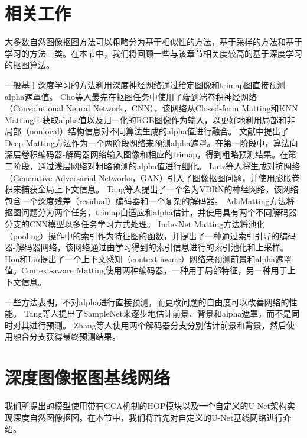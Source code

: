 \section{相关工作}
大多数自然图像抠图方法可以粗略分为基于相似性的方法\cite{levin2008closed,he2010fast,lee2011nonlocal,chen2013knn,aksoy2017designing}，基于采样的方法\cite{wang2007optimized,gastal2010shared,he2011global,feng2016cluster}和基于学习的方法\cite{xu2017deep,lutz2018alphagan,lu2019indices,samplenet,hou2019context,cai2019disentangled}三类。在本节中，我们将回顾一些与该章节相关度较高的基于深度学习的抠图算法。

一般基于深度学习的方法利用深度神经网络通过给定图像和trimap图直接预测alpha遮罩值。
Cho等人\cite{cho2019deep}最先在抠图任务中使用了端到端卷积神经网络（Convolutional Neural Network，CNN），该网络从Closed-form Matting\cite{levin2008closed}和KNN Matting\cite{chen2013knn}中获取alpha值以及归一化的RGB图像作为输入，以更好地利用局部和非局部（nonlocal）结构信息对不同算法生成的alpha值进行融合。
文献\parencite{xu2017deep}中提出了Deep Matting方法作为一个两阶段网络来预测alpha遮罩。在第一阶段中，算法向深层卷积编码器-解码器网络输入图像和相应的trimap，得到粗略预测结果。在第二阶段，通过浅层网络对粗略预测的alpha值进行细化。
Lutz等人\cite{lutz2018alphagan}将生成对抗网络（Generative Adversarial Networks，GAN）引入了图像抠图问题，并使用膨胀卷积来捕获全局上下文信息。
Tang等人\cite{tang2019very}提出了一个名为VDRN的神经网络，该网络包含一个深度残差（residual）编码器和一个复杂的解码器。
AdaMatting\cite{cai2019disentangled}方法将抠图问题分为两个任务，trimap自适应和alpha估计，并使用具有两个不同解码器分支的CNN模型以多任务学习方式处理。
IndexNet Matting\cite{lu2019indices}方法将池化（pooling）操作中的索引作为特征图的函数，并提出了一种通过索引引导的编码器-解码器网络，该网络通过由学习得到的索引信息进行的索引池化和上采样。
Hou和Liu\cite{hou2019context}提出了一个上下文感知（context-aware）网络来预测前景和alpha遮罩值。Context-aware Matting使用两种编码器，一种用于局部特征，另一种用于上下文信息。 

一些方法表明，不对alpha进行直接预测，而更改问题的自由度可以改善网络的性能。
Tang等人\cite{samplenet}提出了SampleNet来逐步地估计前景、背景和alpha遮罩，而不是同时对其进行预测。
Zhang等人\cite{Zhang2019ALF}使用两个解码器分支分别估计前景和背景，然后使用融合分支获得最终预测结果。



\section{深度图像抠图基线网络}
我们所提出的模型使用带有GCA机制的HOP模块以及一个自定义的U-Net\cite{ronneberger2015u}架构实现深度自然图像抠图。在本节中，我们将首先对自定义的U-Net基线网络进行介绍。

